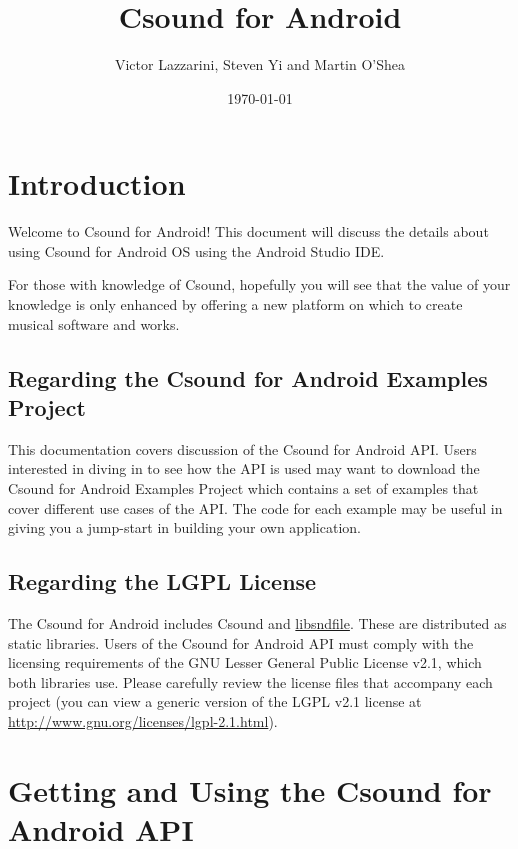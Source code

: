 \documentclass[11pt]{article}
\author{Victor Lazzarini, Steven Yi and Martin O'Shea}
\date{\today}
\title{Csound for Android}
\begin{document}
\maketitle

\section{Introduction}

Welcome to Csound for Android! This document will discuss the details about using Csound for Android OS using the Android Studio IDE. 

For those with knowledge of Csound, hopefully you will see that the value of your knowledge is only enhanced by offering a new platform on which to create musical software and works. 

\subsection{Regarding the Csound for Android Examples Project}

This documentation covers discussion of the Csound for Android API.  Users interested in diving in to see how the API is used may want to download the Csound for Android Examples Project which contains a set of examples that cover different use cases of the API. The code for each example may be useful in giving you a jump-start in building your own application.

\subsection{Regarding the LGPL License}

The Csound for Android includes Csound and \href{http://mega-nerd.com/libsndfile/}{libsndfile}. These are distributed as static libraries. Users of the Csound for Android API must comply with the licensing requirements of the GNU Lesser General Public License v2.1, which both libraries use. Please carefully review the license files that accompany each project (you can view a generic version of the LGPL v2.1 license at \href{http://www.gnu.org/licenses/lgpl-2.1.html}{http://www.gnu.org/licenses/lgpl-2.1.html}). 


\section{Getting and Using the Csound for Android API}
\end{document}
